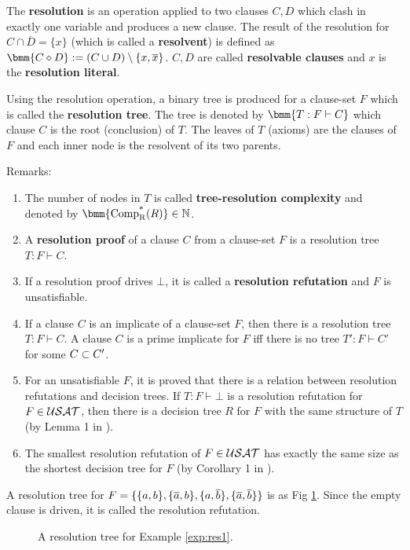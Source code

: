 \documentclass{report}
\begin{document}
\begin{defi}\label{def:resolution}
The \textbf{resolution} is an operation applied to two clauses $C,D$ which clash in exactly one variable and produces a new clause. The result of the resolution for $C \cap \overline D = \{ x \}$ (which is called a \textbf{resolvent}) is defined as $\bmm{C \diamond D} := (C \cup D) \setminus \{x, \overline x\} $. $C,D$ are called \textbf{resolvable clauses} and $x$ is the \textbf{resolution literal}. 
\end{defi}
\begin{defi}\label{def:resolution-tree}
Using the resolution operation, a binary tree is produced for a clause-set $F$ which is called the \textbf{resolution tree}. The tree is denoted by $\bmm{T : F \vdash C}$ which clause $C$ is the root (conclusion) of $T$. The leaves of $T$ (axioms) are the clauses of $F$ and each inner node is the resolvent of its two parents. 
\end{defi}
Remarks:
  \begin{enumerate}
  \item  The number of nodes in $T$ is called \textbf{tree-resolution complexity} and denoted by $\bmm{\comptr(R)} \in \NN$.
  \item  A \textbf{resolution proof} of a clause $C$ from a clause-set $F$ is a resolution tree $T : F \vdash C$.
  \item  If a resolution proof drives $\bot$, it is called a \textbf{resolution refutation} and $F$ is unsatisfiable.
  \item If a clause $C$ is an implicate of a clause-set $F$, then there is a resolution tree $T : F \vdash C$. A clause $C$ is a prime implicate for $F$ iff there is no tree $T': F \vdash C'$ for some $C \subset C'$.
  \item For an unsatisfiable $F$, it is proved that there is a relation between resolution refutations and decision trees. If $T : F \vdash \bot$ is a resolution refutation for $F \in \mathcal{USAT}$, then there is a decision tree $R$ for $F$ with the same structure of $T$ (by Lemma 1 in \cite{BGL13a}).
  \item The smallest resolution refutation of $F \in \mathcal{USAT}$ has exactly the same size as the shortest decision tree for $F$ (by Corollary 1 in \cite{BGL13a}).
  \end{enumerate}

\begin{examp}\label{exp:res1}
A resolution tree for $F = \{ \{ a,b \},\{ \overline a,b \},\{ a, \overline b \},\{ \overline a, \overline b \} \}$ is as Fig \ref{fig:resol1}. Since the empty clause is driven, it is called the resolution refutation.
   \begin{figure}
   \centering  
   \caption{A resolution tree for Example \ref{exp:res1}.}
   \label{fig:resol1}
   \end{figure}
\end{examp}
\end{document}
